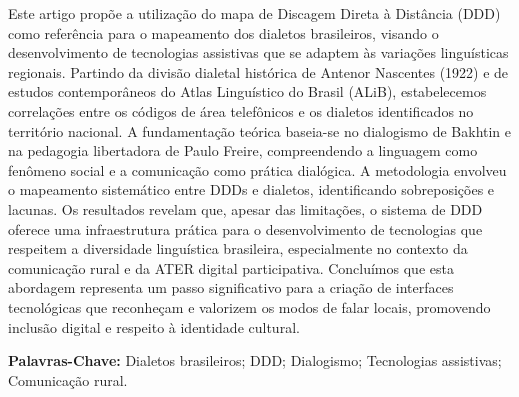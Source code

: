 	\begin{resumo}

Este artigo propõe a utilização do mapa de Discagem Direta à Distância (DDD) como referência para o mapeamento dos dialetos brasileiros, visando o desenvolvimento de tecnologias assistivas que se adaptem às variações linguísticas regionais. Partindo da divisão dialetal histórica de Antenor Nascentes (1922) e de estudos contemporâneos do Atlas Linguístico do Brasil (ALiB), estabelecemos correlações entre os códigos de área telefônicos e os dialetos identificados no território nacional. A fundamentação teórica baseia-se no dialogismo de Bakhtin e na pedagogia libertadora de Paulo Freire, compreendendo a linguagem como fenômeno social e a comunicação como prática dialógica. A metodologia envolveu o mapeamento sistemático entre DDDs e dialetos, identificando sobreposições e lacunas. Os resultados revelam que, apesar das limitações, o sistema de DDD oferece uma infraestrutura prática para o desenvolvimento de tecnologias que respeitem a diversidade linguística brasileira, especialmente no contexto da comunicação rural e da ATER digital participativa. Concluímos que esta abordagem representa um passo significativo para a criação de interfaces tecnológicas que reconheçam e valorizem os modos de falar locais, promovendo inclusão digital e respeito à identidade cultural.
\\[0.5em]

		
		\vspace*{0.5cm}
		
		\noindent\textbf{{Palavras-Chave: }}  Dialetos brasileiros; DDD; Dialogismo; Tecnologias assistivas; Comunicação rural.

		
	\end{resumo}
	
	
